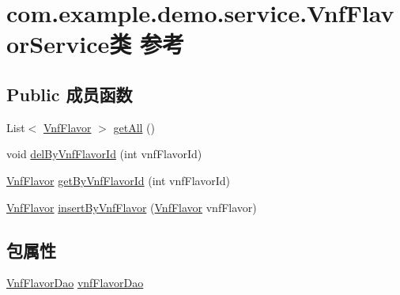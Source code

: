 \hypertarget{classcom_1_1example_1_1demo_1_1service_1_1_vnf_flavor_service}{}\section{com.\+example.\+demo.\+service.\+Vnf\+Flavor\+Service类 参考}
\label{classcom_1_1example_1_1demo_1_1service_1_1_vnf_flavor_service}
\subsection*{Public 成员函数}
\begin{DoxyCompactItemize}
\item 
List$<$ \mbox{\hyperlink{classcom_1_1example_1_1demo_1_1modular_1_1_vnf_flavor}{Vnf\+Flavor}} $>$ \mbox{\hyperlink{classcom_1_1example_1_1demo_1_1service_1_1_vnf_flavor_service_a427ebde990f38b0d9eed5b4b6d88c781}{get\+All}} ()
\item 
void \mbox{\hyperlink{classcom_1_1example_1_1demo_1_1service_1_1_vnf_flavor_service_ade4a771a37d33cc374fa174431f26ff2}{del\+By\+Vnf\+Flavor\+Id}} (int vnf\+Flavor\+Id)
\item 
\mbox{\hyperlink{classcom_1_1example_1_1demo_1_1modular_1_1_vnf_flavor}{Vnf\+Flavor}} \mbox{\hyperlink{classcom_1_1example_1_1demo_1_1service_1_1_vnf_flavor_service_a28ee9e2a072fd14856f56b4377123673}{get\+By\+Vnf\+Flavor\+Id}} (int vnf\+Flavor\+Id)
\item 
\mbox{\hyperlink{classcom_1_1example_1_1demo_1_1modular_1_1_vnf_flavor}{Vnf\+Flavor}} \mbox{\hyperlink{classcom_1_1example_1_1demo_1_1service_1_1_vnf_flavor_service_a22ef595a9e11940cbeec340b26ed22b9}{insert\+By\+Vnf\+Flavor}} (\mbox{\hyperlink{classcom_1_1example_1_1demo_1_1modular_1_1_vnf_flavor}{Vnf\+Flavor}} vnf\+Flavor)
\end{DoxyCompactItemize}
\subsection*{包属性}
\begin{DoxyCompactItemize}
\item 
\mbox{\hyperlink{interfacecom_1_1example_1_1demo_1_1dao_1_1_vnf_flavor_dao}{Vnf\+Flavor\+Dao}} \mbox{\hyperlink{classcom_1_1example_1_1demo_1_1service_1_1_vnf_flavor_service_ad141197af84dd67c5403422af1274c8d}{vnf\+Flavor\+Dao}}
\end{DoxyCompactItemize}


